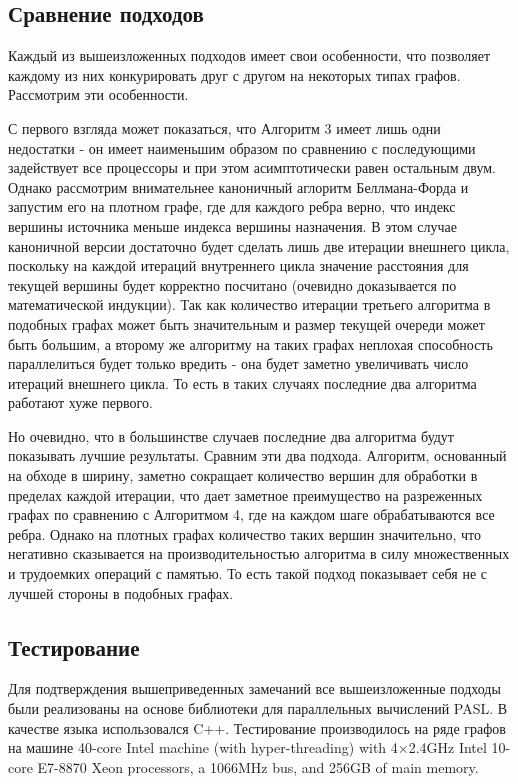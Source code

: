 \FloatBarrier
\subsection{Сравнение подходов}
Каждый из вышеизложенных подходов имеет свои особенности, что позволяет каждому из них конкурировать друг с другом на некоторых типах графов. Рассмотрим эти особенности.

С первого взгляда может показаться, что Алгоритм 3 имеет лишь одни недостатки - он имеет наименьшим образом по сравнению с последующими задействует все процессоры и при этом асимптотически равен остальным двум. Однако рассмотрим внимательнее каноничный аглоритм Беллмана-Форда и запустим его на плотном графе, где для каждого ребра верно, что индекс вершины источника меньше индекса вершины назначения. В этом случае каноничной версии достаточно будет сделать лишь две итерации внешнего цикла, поскольку на каждой итераций внутреннего цикла значение расстояния для текущей вершины будет корректно посчитано (очевидно доказывается по математической индукции). Так как количество итерации третьего алгоритма в подобных графах может быть значительным и размер текущей очереди может быть большим, а второму же алгоритму на таких графах неплохая способность параллелиться будет только вредить - она будет заметно увеличивать число итераций внешнего цикла. То есть в таких случаях последние два алгоритма работают хуже первого.   

Но очевидно, что в большинстве случаев последние два алгоритма будут показывать лучшие результаты. Сравним эти два подхода. Алгоритм, основанный на обходе в ширину, заметно сокращает количество вершин для обработки в пределах каждой итерации, что дает заметное преимущество на разреженных графах по сравнению с Алгоритмом 4, где на каждом шаге обрабатываются все ребра. Однако на плотных графах количество таких вершин значительно, что негативно сказывается на производительностью алгоритма в силу множественных и трудоемких операций с памятью. То есть такой подход показывает себя не с лучшей стороны в подобных графах.  

\FloatBarrier
\subsection{Тестирование}

Для подтверждения вышеприведенных замечаний все вышеизложенные подходы были реализованы на основе библиотеки для параллельных вычислений PASL. В качестве языка использовался C++. Тестирование производилось на ряде графов на машине 40-core Intel machine (with hyper-threading) with 4×2.4GHz Intel
10-core E7-8870 Xeon processors, a 1066MHz bus, and 256GB of
main memory. 

